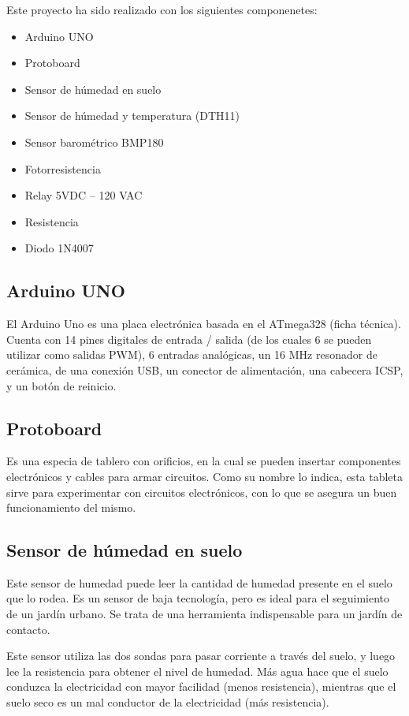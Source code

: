 \documentclass{article}
\begin{document}
Este proyecto ha sido realizado con los siguientes componenetes:

\begin{itemize}
	\item Arduino UNO
	\item Protoboard
	\item Sensor de húmedad en suelo
	\item Sensor de húmedad  y temperatura (DTH11)
	\item Sensor barométrico BMP180
	\item Fotorresistencia
	\item Relay 5VDC – 120 VAC
	\item Resistencia
	\item Diodo 1N4007
\end{itemize}

\subsection{Arduino UNO}

El Arduino Uno es una placa electrónica basada en el  ATmega328  (ficha técnica). Cuenta con 14 pines digitales de entrada / salida (de los cuales 6 se pueden utilizar como salidas PWM), 6 entradas analógicas, un 16  MHz  resonador de cerámica, de una conexión USB, un conector de alimentación, una cabecera ICSP, y un botón de reinicio.

\subsection{Protoboard}

Es una especia de tablero con orificios, en la cual se pueden insertar componentes electrónicos y cables para armar circuitos. Como su nombre lo indica, esta tableta sirve para experimentar con circuitos electrónicos, con lo que se asegura un buen funcionamiento del mismo. 

\subsection{Sensor de húmedad en suelo}

Este sensor de humedad puede leer la cantidad de humedad presente en el suelo que lo rodea. Es un sensor de baja tecnología, pero es ideal para el seguimiento de un jardín urbano. Se trata de una herramienta indispensable para un jardín de contacto.

Este sensor utiliza las dos sondas para pasar corriente a través del suelo, y luego  lee la resistencia para obtener el nivel de humedad. Más agua hace que el suelo conduzca la electricidad con mayor facilidad (menos resistencia), mientras que el suelo seco es un mal conductor de la electricidad (más resistencia).
\end{document}
